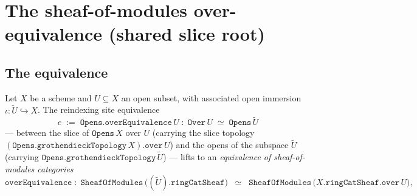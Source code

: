 \chapter{The sheaf-of-modules over-equivalence (shared slice root)}
\label{chap:Picard_SheafOverEquivalence}

\section{The equivalence}
\label{sec:soe_equivalence}

\begin{definition}\leanok
  \label{def:sheafofmodules_over_equivalence}
  Let \(X\) be a scheme and \(U \subseteq X\) an open subset, with associated open
  immersion \(\iota : \widetilde{U} \hookrightarrow X\). The reindexing site
  equivalence
  \[
    e \;:=\; \mathtt{Opens.overEquivalence}\,U
       \;:\; \mathtt{Over}\,U \;\simeq\; \mathtt{Opens}\,\widetilde{U}
  \]
  --- between the slice of \(\mathtt{Opens}\,X\) over \(U\) (carrying the slice
  topology \((\mathtt{Opens.grothendieckTopology}\,X).\mathtt{over}\,U\)) and the
  opens of the subspace \(\widetilde{U}\) (carrying
  \(\mathtt{Opens.grothendieckTopology}\,\widetilde{U}\)) --- lifts to an
  \emph{equivalence of sheaf-of-modules categories}
  \[
    \mathtt{overEquivalence}\;:\;
      \mathtt{SheafOfModules}\,\bigl((\widetilde{U}).\mathtt{ringCatSheaf}\bigr)
        \;\;\simeq\;\;
      \mathtt{SheafOfModules}\,\bigl(X.\mathtt{ringCatSheaf}.\mathtt{over}\,U\bigr),
\]
\end{definition}
